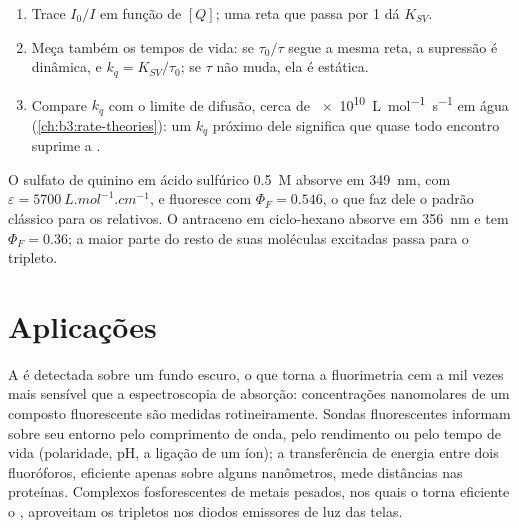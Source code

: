 \begin{method}\label{met:b3:electronic-spectroscopy:stern-volmer}
\begin{enumerate}
  \item Trace $I_0/I$ em função de $[Q]$; uma reta que passa por 1 dá $K_{SV}$.
  \item Meça também os tempos de vida: se $\tau_0/\tau$ segue a mesma reta, a supressão
        é dinâmica, e $k_q = K_{SV}/\tau_0$; se $\tau$ não muda, ela é estática.
  \item Compare $k_q$ com o limite de difusão, cerca de \qty{e10}{L.mol^{-1}.s^{-1}} em
        água (\cref{ch:b3:rate-theories}): um $k_q$ próximo dele significa que quase todo
        encontro suprime a .
\end{enumerate}
\end{method}

\begin{example}\label{ex:b3:electronic-spectroscopy:quinine}
O sulfato de quinino em ácido sulfúrico \qty{0.5}{M} absorve em \qty{349}{nm}, com $\varepsilon =
\qty{5700}{L.mol^{-1}.cm^{-1}}$, e fluoresce com $\Phi_F = 0.546$, o que faz dele o
padrão clássico para os  relativos. O antraceno em
ciclo-hexano absorve em \qty{356}{nm} e tem $\Phi_F = 0.36$; a maior parte do resto
de suas moléculas excitadas passa para o tripleto.
\end{example}

\section{Aplicações}

A  é detectada sobre um fundo escuro, o que torna a fluorimetria
cem a mil vezes mais sensível que a espectroscopia de absorção: concentrações
nanomolares de um composto fluorescente são medidas rotineiramente. Sondas
fluorescentes informam sobre seu entorno pelo comprimento de onda, pelo
rendimento ou pelo tempo de vida (polaridade, pH, a ligação de um íon); a
transferência de energia entre dois fluoróforos, eficiente apenas sobre alguns
nanômetros, mede distâncias nas proteínas. Complexos fosforescentes de metais
pesados, nos quais o  torna eficiente o , aproveitam os tripletos nos diodos emissores de luz das telas.

